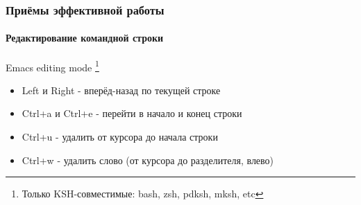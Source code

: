 \begin{frame}
  \frametitle{Приёмы эффективной работы}
  \framesubtitle{Редактирование командной строки}

  \Large{\alert{Emacs editing mode}} \footnote{Только KSH-совместимые: bash, zsh, pdksh, mksh, etc}

  \begin{itemize}
    \item \textquotedbl Left \textquotedbl и \textquotedbl Right \textquotedbl - вперёд-назад по текущей строке \pause
    \item \textquotedbl Ctrl+a \textquotedbl и \textquotedbl Ctrl+e \textquotedbl  - перейти в начало и конец строки \pause
    \item \textquotedbl Ctrl+u  \textquotedbl- удалить от курсора до начала строки \pause
    \item \textquotedbl Ctrl+w \textquotedbl- удалить слово (от курсора до разделителя, влево) 
  \end{itemize}
    
\end{frame}

